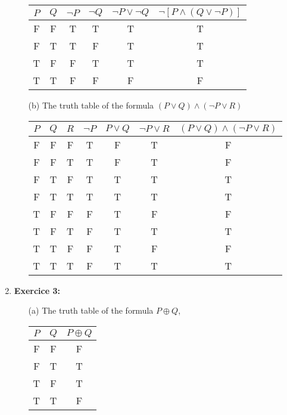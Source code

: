 \documentclass{article} %
\begin{document}
\begin{enumerate}
\begin{itemize}
            \begin{center}
            \begin{tabular}{cccccc}
                $P$ & $Q$ & $\neg P$ & $\neg Q$ & $\neg P \lor \neg Q$ & $\neg [P \land (Q \lor \neg P)]$ \\
                \hline
                F & F & T & T & T & T \\
                F & T & T & F & T & T \\
                T & F & F & T & T & T \\
                T & T & F & F & F & F \\
            \end{tabular}
            \end{center}

            \item[(b)] The truth table of the formula $(P \lor Q) \land (\neg P \lor R)$
            \begin{center}
            \begin{tabular}{ccccccc}
                $P$ & $Q$ & $R$ & $\neg P$ & $P \lor Q$ & $\neg P \lor R$ & $(P \lor Q) \land (\neg P \lor R)$ \\
                \hline
                F & F & F & T & F & T & F \\
                F & F & T & T & F & T & F \\
                F & T & F & T & T & T & T \\
                F & T & T & T & T & T & T \\
                T & F & F & F & T & F & F \\
                T & F & T & F & T & T & T \\
                T & T & F & F & T & F & F \\
                T & T & T & F & T & T & T \\
            \end{tabular}
            \end{center}
        \end{itemize}
    
    \item \textbf{Exercice 3:}
    \begin{itemize}
        \item[(a)] The truth table of the formula $P \oplus Q$,
        \begin{center}
        \begin{tabular}{ccc}
            $P$ & $Q$ & $P \oplus Q$ \\
            \hline
            F & F & F \\
            F & T & T \\
            T & F & T \\
            T & T & F \\
        \end{tabular}
        \end{center}


\end{itemize}
\end{enumerate}
\end{document}
